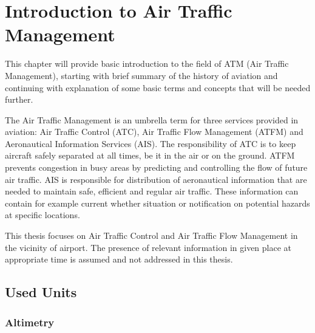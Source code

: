 \chapter{Introduction to Air Traffic Management}

This chapter will provide basic introduction to the field of ATM (Air Traffic Management), starting with brief summary of the history of aviation and continuing with explanation of some basic terms and concepts that will be needed further.

The Air Traffic Management is an umbrella term for three services provided in aviation: Air Traffic Control (ATC), Air Traffic Flow Management (ATFM) and Aeronautical Information Services (AIS). The responsibility of ATC is to keep aircraft safely separated at all times, be it in the air or on the ground. ATFM prevents congestion in busy areas by predicting and controlling the flow of future air traffic. AIS is responsible for distribution of aeronautical information that are needed to maintain safe, efficient and regular air traffic. These information can contain for example current whether situation or notification on potential hazards at specific locations. \cite{atm}

This thesis focuses on Air Traffic Control and Air Traffic Flow Management in the vicinity of airport. The presence of relevant information in given place at appropriate time is assumed and not addressed in this thesis.











\section{Used Units}
\subsection{Altimetry}


